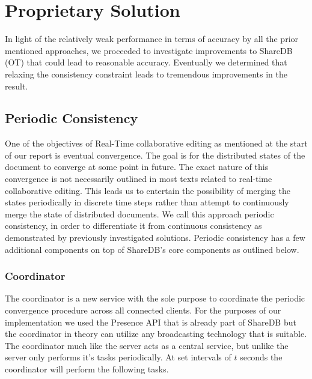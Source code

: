 \documentclass[9pt, titlepage]{article}
\begin{document}
  \section{Proprietary Solution}
  In light of the relatively weak performance in terms of accuracy by all the prior mentioned approaches, we proceeded to investigate
  improvements to ShareDB (OT) that could lead to reasonable accuracy. Eventually we determined that relaxing the consistency constraint
  leads to tremendous improvements in the result. 
  
  \subsection{Periodic Consistency}
  One of the objectives of Real-Time collaborative editing as mentioned at the start of our report is eventual convergence. The goal is
  for the distributed states of the document to converge at some point in future. The exact nature of this convergence is not necessarily
  outlined in most texts related to real-time collaborative editing. This leads us to entertain the possibility of merging the states
  periodically in discrete time steps rather than attempt to continuously merge the state of distributed documents. We call this approach
  periodic consistency, in order to differentiate it from continuous consistency as demonstrated by previously investigated solutions.
  Periodic consistency has a few additional components on top of ShareDB's core components as outlined below.

  \subsubsection{Coordinator}
  The coordinator is a new service with the sole purpose to coordinate the periodic convergence procedure across all connected clients.
  For the purposes of our implementation we used the Presence API that is already part of ShareDB but the coordinator in theory can
  utilize any broadcasting technology that is suitable. The coordinator much like the server acts as a central service, but unlike the 
  server only performs it's tasks periodically. At set intervals of \(t\) seconds the coordinator will perform the following tasks.
\end{document}
